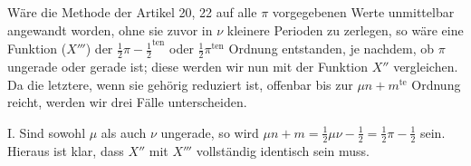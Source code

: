\begingroup
\renewcommand{\arraystretch}{1.45}
Wäre die Methode der Artikel 20, 22 auf alle $\pi$ vorgegebenen Werte unmittelbar angewandt worden, ohne sie zuvor in $\nu$ kleinere Perioden zu zerlegen, so wäre eine Funktion ($X'''$) der $\tfrac12\pi-\tfrac12^{\mathrm{ten}}$ oder $\tfrac12\pi^{\mathrm{ten}}$ Ordnung entstanden, je nachdem, ob $\pi$ ungerade oder gerade ist; diese werden wir nun mit der Funktion $X''$ vergleichen. Da die letztere, wenn sie gehörig reduziert ist, offenbar bis zur $\mu n+m^{\mathrm{te}}$ Ordnung reicht, werden wir drei Fälle unterscheiden.

I. Sind sowohl $\mu$ als auch $\nu$ ungerade, so wird $\mu n+m=\tfrac12\mu\nu-\tfrac12=\tfrac12\pi-\tfrac12$ sein. Hieraus ist klar, dass $X''$ mit $X'''$ vollständig identisch sein muss.

